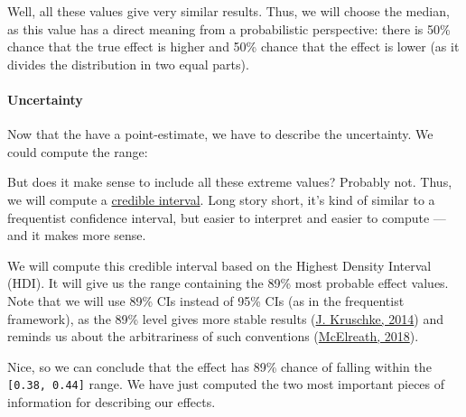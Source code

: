 \documentclass[10pt,a4paper,onecolumn]{article}
\newenvironment{Shaded}{\begin{snugshade}}{\end{snugshade}}
\newcommand{\AttributeTok}[1]{\textcolor[rgb]{0.77,0.63,0.00}{#1}}
\newcommand{\CommentTok}[1]{\textcolor[rgb]{0.56,0.35,0.01}{\textit{#1}}}
\newcommand{\FloatTok}[1]{\textcolor[rgb]{0.00,0.00,0.81}{#1}}
\newcommand{\FunctionTok}[1]{\textcolor[rgb]{0.00,0.00,0.00}{#1}}
\newcommand{\NormalTok}[1]{#1}
\newcommand{\SpecialCharTok}[1]{\textcolor[rgb]{0.00,0.00,0.00}{#1}}
\let\oldparagraph\paragraph
\renewcommand{\paragraph}[1]{\oldparagraph{#1}\mbox{}}
\begin{document}
Well, all these values give very similar results. Thus, we will choose
the median, as this value has a direct meaning from a probabilistic
perspective: there is 50\% chance that the true effect is higher and
50\% chance that the effect is lower (as it divides the distribution in
two equal parts).

\hypertarget{uncertainty}{%
\paragraph{Uncertainty}\label{uncertainty}}

Now that the have a point-estimate, we have to describe the uncertainty.
We could compute the range:

\begin{Shaded}
\end{Shaded}

But does it make sense to include all these extreme values? Probably
not. Thus, we will compute a
\href{https://easystats.github.io/bayestestR/articles/credible_interval.html}{credible
interval}. Long story short, it's kind of similar to a frequentist
confidence interval, but easier to interpret and easier to compute ---
and it makes more sense.

We will compute this credible interval based on the Highest Density
Interval (HDI). It will give us the range containing the 89\% most
probable effect values. Note that we will use 89\% CIs instead of 95\%
CIs (as in the frequentist framework), as the 89\% level gives more
stable results (\protect\hyperlink{ref-kruschke2014doing}{J. Kruschke,
2014}) and reminds us about the arbitrariness of such conventions
(\protect\hyperlink{ref-mcelreath2018statistical}{McElreath, 2018}).

\begin{Shaded}
\end{Shaded}

Nice, so we can conclude that the effect has 89\% chance of falling
within the \texttt{{[}0.38,\ 0.44{]}} range. We have just computed the
two most important pieces of information for describing our effects.
\end{document}
